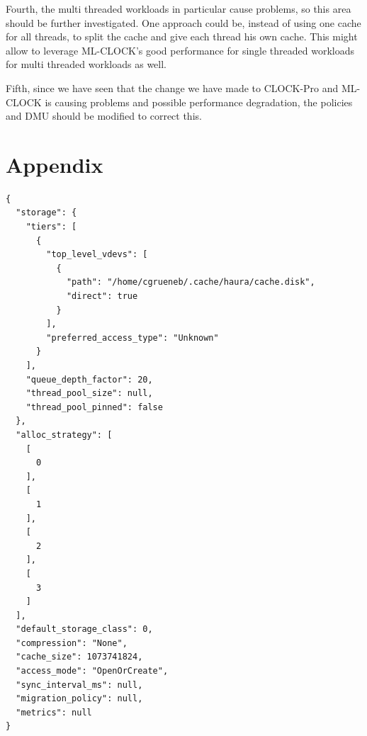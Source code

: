 \documentclass[
	12pt,
	a4paper,
	abstract,
	bibliography=totoc,
	chapterprefix,
	headings=openright,
	numbers=endperiod,
	parskip=half,
	twoside,
]{scrreprt}
\begin{document}
Fourth, the multi threaded workloads in particular cause problems, so this area should be further investigated.
One approach could be, instead of using one cache for all threads, to split the cache and give each thread his own cache.
This might allow to leverage ML-CLOCK's good performance for single threaded workloads for multi threaded workloads as well.

Fifth, since we have seen that the change we have made to CLOCK-Pro and ML-CLOCK 
is causing problems and possible performance degradation, the policies and DMU should be 
modified to correct this.








\appendix

\chapter{Appendix}
\label{cha:appendix}


\begin{lstlisting}[mathescape=true,caption=Haura configuration file for benchmark runs,label=lst:configuration haura]
{
  "storage": {
    "tiers": [
      {
        "top_level_vdevs": [
          {
            "path": "/home/cgrueneb/.cache/haura/cache.disk",
            "direct": true
          }
        ],
        "preferred_access_type": "Unknown"
      }
    ],
    "queue_depth_factor": 20,
    "thread_pool_size": null,
    "thread_pool_pinned": false
  },
  "alloc_strategy": [
    [
      0
    ],
    [
      1
    ],
    [
      2
    ],
    [
      3
    ]
  ],
  "default_storage_class": 0,
  "compression": "None",
  "cache_size": 1073741824,
  "access_mode": "OpenOrCreate",
  "sync_interval_ms": null,
  "migration_policy": null,
  "metrics": null
}

\end{lstlisting}




\chapter*{}
\end{document}
